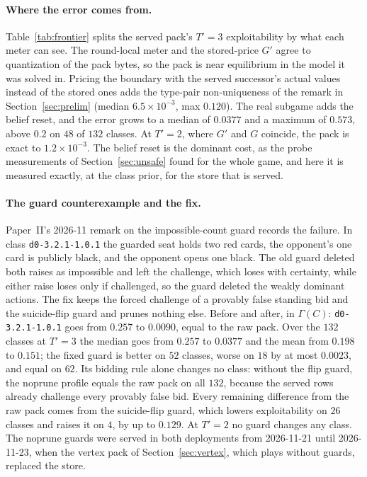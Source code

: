 \documentclass[11pt]{article}
\theoremstyle{plain}
\theoremstyle{definition}
\theoremstyle{remark}
\newcommand{\code}[1]{\texttt{\small #1}}
\newcommand{\game}{\ensuremath{G}}
\newcommand{\gp}{\ensuremath{G'}}
\begin{document}
\paragraph{Where the error comes from.} Table~\ref{tab:frontier} splits
the served pack's $T'=3$ exploitability by what each meter can see. The
round-local meter and the stored-price $\gp$ agree to quantization of
the pack bytes, so the pack is near equilibrium in the model it was
solved in. Pricing the boundary with the served successor's actual
values instead of the stored ones adds the type-pair non-uniqueness of
the remark in Section~\ref{sec:prelim} (median $6.5\times10^{-3}$, max
$0.120$). The real subgame adds the belief reset, and the error grows
to a median of $0.0377$ and a maximum of $0.573$, above $0.2$ on $48$ of
$132$ classes. At $T'=2$, where
$\gp$ and $\game$ coincide, the pack is exact to $1.2\times10^{-3}$. The
belief reset is the dominant cost, as the probe measurements of
Section~\ref{sec:unsafe} found for the whole game, and here it is
measured exactly, at the class prior, for the store that is served.

\paragraph{The guard counterexample and the fix.} Paper~II's 2026-11
remark on the impossible-count guard records the failure. In class
\code{d0-3.2.1-1.0.1} the guarded seat holds two red cards, the
opponent's one card is publicly black, and the opponent opens one
black. The old guard deleted both raises as impossible and left the
challenge, which loses with certainty, while either raise loses only if
challenged, so the guard deleted the weakly dominant actions. The fix
keeps the forced challenge of a provably false standing bid and the
suicide-flip guard and prunes nothing else. Before and after, in
$\Gamma(C)$:
\code{d0-3.2.1-1.0.1} goes from $0.257$ to $0.0090$, equal to the raw
pack. Over the $132$ classes at $T'=3$ the median goes from $0.257$ to
$0.0377$ and the mean from $0.198$ to $0.151$; the fixed guard is
better on $52$ classes, worse on $18$ by at most $0.0023$, and equal on
$62$. Its bidding rule alone changes no class: without the flip guard,
the noprune profile equals the raw pack on all $132$, because the
served rows already challenge every provably false bid. Every remaining
difference from the raw pack comes from the suicide-flip guard, which
lowers exploitability on $26$ classes and raises it on $4$, by up to
$0.129$. At $T'=2$ no guard changes any class. The noprune guards were
served in both deployments from 2026-11-21 until 2026-11-23, when the
vertex pack of Section~\ref{sec:vertex}, which plays without guards,
replaced the store.
\end{document}
